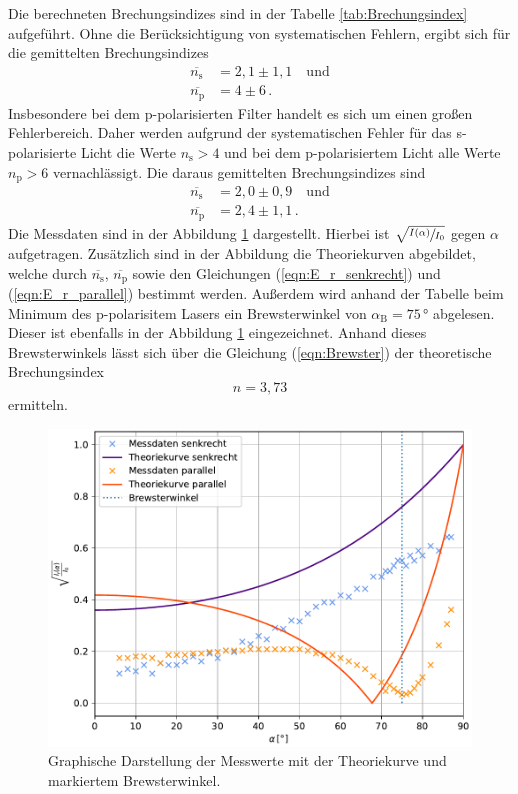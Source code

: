 Die berechneten Brechungsindizes sind in der Tabelle \ref{tab:Brechungsindex} aufgeführt. Ohne die Berücksichtigung von systematischen Fehlern, ergibt sich für die gemittelten Brechungsindizes
\begin{align*}
  \overline{n_{\text{s}}} &= 2,1\pm 1,1\quad \text{und}\\
  \overline{n_{\text{p}}} &= 4\pm 6\,.
\end{align*}
Insbesondere bei dem p-polarisierten Filter handelt es sich um einen großen Fehlerbereich. Daher werden aufgrund der systematischen Fehler für das s-polarisierte Licht die Werte $n_{\text{s}} > 4$ und bei dem p-polarisiertem 
Licht alle Werte $n_{\text{p}} > 6$ vernachlässigt. Die daraus gemittelten Brechungsindizes sind
\begin{align*}
  \overline{n_{\text{s}}} &= 2,0\pm 0,9\quad \text{und}\\
  \overline{n_{\text{p}}} &= 2,4\pm 1,1\,.
\end{align*}
Die Messdaten sind in der Abbildung \ref{fig:plot} dargestellt. Hierbei ist $\sqrt{\sfrac{I(\alpha)}{I_0}}$ gegen $\alpha$ aufgetragen. Zusätzlich sind in der Abbildung
die Theoriekurven abgebildet, welche durch $\overline{n_{\text{s}}}$, $\overline{n_{\text{p}}}$ sowie den Gleichungen (\ref{eqn:E_r_senkrecht}) und (\ref{eqn:E_r_parallel}) bestimmt werden.
Außerdem wird anhand der Tabelle beim Minimum des p-polarisitem Lasers ein Brewsterwinkel von $\alpha_{\text{B}} = 75\,°$ abgelesen. Dieser ist ebenfalls in der Abbildung \ref{fig:plot} eingezeichnet.
Anhand dieses Brewsterwinkels lässt sich über die Gleichung (\ref{eqn:Brewster}) der theoretische Brechungsindex $$n = 3,73$$ ermitteln.
\begin{figure}[H]
  \includegraphics[width=\textwidth]{plot.pdf}
  \caption{Graphische Darstellung der Messwerte mit der Theoriekurve und markiertem Brewsterwinkel.}
  \label{fig:plot}
\end{figure}
